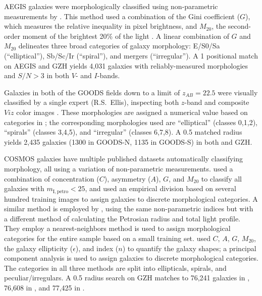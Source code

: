 \documentclass[twocolumn]{aastex6}
\begin{document}
AEGIS galaxies were morphologically classified using non-parametric
measurements by \citet{lot08}. This method used a combination of the Gini
coefficient ($G$), which measures the relative inequality in pixel brightness,
and $M_{20}$, the second-order moment of the brightest 20\% of the light
\citep{lot04}. A linear combination of $G$ and $M_{20}$ delineates three broad
categories of galaxy morphology: E/S0/Sa (``elliptical''), Sb/Sc/Ir
(``spiral''), and mergers (``irregular''). A 1\arcsec{} positional match on
AEGIS and GZH yields 4,031 galaxies with reliably-measured morphologies and
$S/N>3$ in both $V$- and $I$-bands. 

Galaxies in both of the GOODS fields down to a limit of $z_{AB}=22.5$ were
visually classified by a single expert (R.S.~Ellis), inspecting both $z$-band
and composite $Viz$ color images \citep{bun05}. These morphologies are assigned
a numerical value based on categories in \citet{bri98a}; the corresponding
morphologies used are ``elliptical'' (classes 0,1,2), ``spirals'' (classes
3,4,5), and ``irregular'' (classes 6,7,8). A 0.5\arcsec{} matched radius yields
2,435 galaxies (1300 in GOODS-N, 1135 in GOODS-S) in both \citet{bun05} and
GZH.  

COSMOS galaxies have multiple published datasets automatically classifying
morphology, all using a variation of non-parametric measurements. \citet{cas07}
used a combination of concentration ($C$), asymmetry ($A$), $G$, and $M_{20}$
\citep{cas05} to classify all galaxies with $m_\mathrm{I,petro}<25$, and used
an empirical division based on several hundred training images to assign
galaxies to discrete morphological categories. A similar method is employed by
\citet{tas11}, using the same non-parametric indices but with a different
method of calculating the Petrosian radius and total light profile. They employ
a nearest-neighbors method is used to assign morphological categories for the
entire sample based on a small training set. \citet[][ZEST]{sca07} used $C$,
$A$, $G$, $M_{20}$, the galaxy ellipticity ($\epsilon$), and \sersic{} index
($n$) to quantify the galaxy shapes; a principal component analysis is used to
assign galaxies to discrete morphological categories. The categories in all
three methods are split into ellipticals, spirals, and peculiar/irregulars. A
0.5\arcsec{} radius search on GZH matches to 76,241 galaxies in \citet{cas07},
76,608 in \citet{tas11}, and 77,425 in \citet{sca07}.
\end{document}
